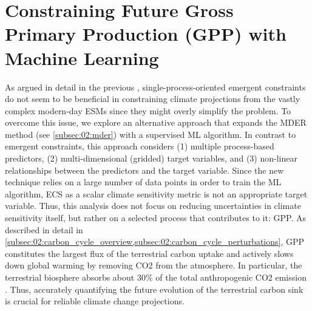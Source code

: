 
%



\chapter{Constraining Future Gross Primary Production (\acs{GPP}) with Machine
  Learning}
\label{ch:06:paper_gpp}

As argued in detail in the previous ,
single-process-oriented emergent constraints do not seem to be beneficial in
constraining climate projections from the vastly complex modern-day \acp{ESM}
since they might overly simplify the problem. To overcome this issue, we
explore an alternative approach that expands the \acf{MDER} method (see
\cref{subsec:02:mder}) with a supervised \acf{ML} algorithm. In contrast to
emergent constraints, this approach considers (1) multiple process-based
predictors, (2) multi-dimensional (gridded) target variables, and (3)
non-linear relationships between the predictors and the target variable. Since
the new technique relies on a large number of data points in order to train the
\ac{ML} algorithm, \ac{ECS} as a scalar climate sensitivity metric is not an
appropriate target variable. Thus, this analysis does not focus on reducing
uncertainties in climate sensitivity itself, but rather on a selected process
that contributes to it: \ac{GPP}. As described in detail in
\cref{subsec:02:carbon_cycle_overview,subsec:02:carbon_cycle_perturbations},
\ac{GPP} constitutes the largest flux of the terrestrial carbon uptake and
actively slows down global warming by removing \ac{CO2} from the atmosphere. In
particular, the terrestrial biosphere absorbs about $30 \unit{\%}$ of the total
anthropogenic \ac{CO2} emission \autocite{Friedlingstein2020}. Thus, accurately
quantifying the future evolution of the terrestrial carbon sink is crucial for
reliable climate change projections.

